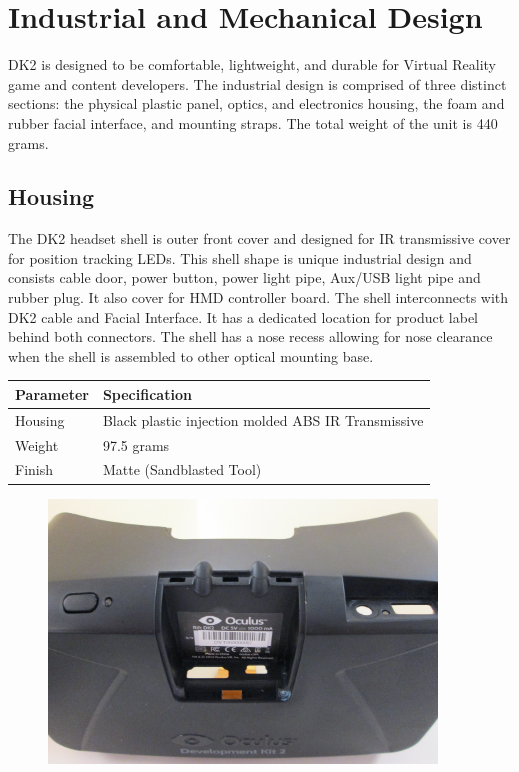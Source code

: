 \documentclass[letterpaper]{article}
\begin{document}
\newpage

\section{Industrial and Mechanical Design}
DK2 is designed to be comfortable, lightweight, and durable for Virtual Reality game and content developers.  The industrial design is comprised of three distinct sections: the physical plastic panel, optics, and electronics housing, the foam and rubber facial interface, and mounting straps.  The total weight of the unit is 440 grams.

\subsection{Housing}
The DK2 headset shell is outer front cover and designed for IR transmissive cover for position tracking LEDs. This shell shape is unique industrial design and consists cable door, power button, power light pipe, Aux/USB light pipe and rubber plug. It also cover for HMD controller board. The shell interconnects with DK2 cable and Facial Interface. It has a dedicated location for product label behind both connectors. The shell has a nose recess allowing for nose clearance when the shell is assembled to other optical mounting base.

\begin{center}
    \begin{tabular}{ | l | p{8cm} |}
    \hline
    \cellcolor{lightgray} Parameter & \cellcolor{lightgray} Specification \\ \hline
    Housing & Black plastic injection molded ABS IR Transmissive \\ \hline
    Weight & 97.5 grams \\ \hline
    Finish & Matte (Sandblasted Tool) \\ \hline
    \end{tabular}
\end{center}

\begin{figure}[H]  
  \centering
    \includegraphics[width=0.92\textwidth]{Figures/image2-17.png}
\end{figure}
\end{document}
